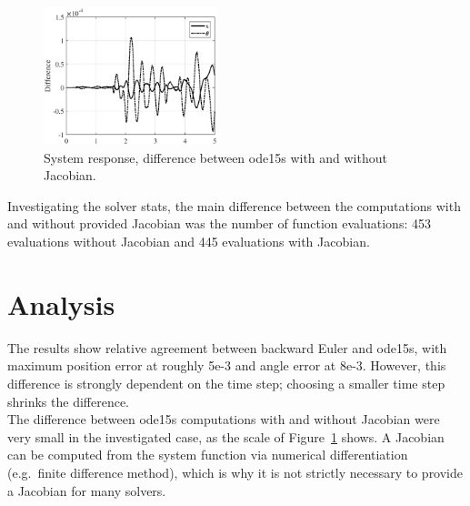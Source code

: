 \documentclass{article}
\begin{document}
	\begin{figure}[h!]
		\centering
		\includegraphics[width=0.45\textwidth]{diff_jac.eps}
		\caption{System response, difference between ode15s with and without Jacobian.\label{fig:jacobian}}
	\end{figure}

	Investigating the solver stats, the main difference between the computations with and without provided Jacobian was the number of function evaluations: 453 evaluations without Jacobian and 445 evaluations with Jacobian.
	
	\section*{Analysis}
	The results show relative agreement between backward Euler and ode15s, with maximum position error at roughly 5e-3 and angle error at 8e-3. However, this difference is strongly dependent on the time step; choosing a smaller time step shrinks the difference.\\
	
	The difference between ode15s computations with and without Jacobian were very small in the investigated case, as the scale of Figure~\ref{fig:jacobian} shows. A Jacobian can be computed from the system function via numerical differentiation (e.g.~finite difference method), which is why it is not strictly necessary to provide a Jacobian for many solvers.
\end{document}
